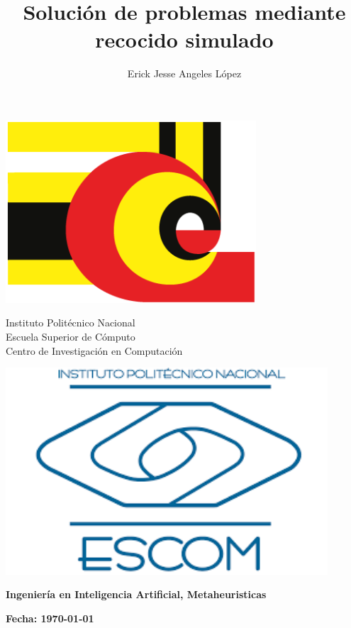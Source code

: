 \documentclass[12pt,twoside]{article}
\title{Solución de problemas mediante recocido simulado}
\author{Erick Jesse Angeles López}
\date{}
\begin{document}
	
	\begin{center}
		
		\begin{minipage}{0.17\textwidth}
			\centering
			\includegraphics[width=0.7\textwidth]{img/cic_logo.png} %
		\end{minipage}
		\begin{minipage}{.55\textwidth}
			\centering
			{\Large Instituto Politécnico Nacional}\\
			{\Large Escuela Superior de Cómputo}\\
			{\Large Centro de Investigación en Computación}
		\end{minipage}
		\begin{minipage}{0.17\textwidth}
			\centering
			\includegraphics[width=0.9\textwidth]{img/escom_logo} %
		\end{minipage}			
	\end{center}
	
	
	\centerline{\bf Ingeniería en Inteligencia Artificial, Metaheuristicas}
	
	\centerline{\bf Fecha: \today}
	
\end{document}
